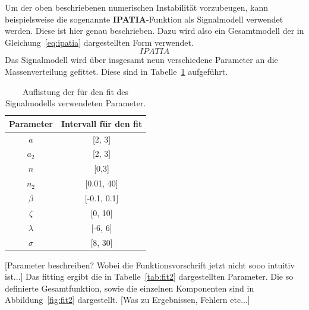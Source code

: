 %
Um der oben beschriebenen numerischen Instabilität vorzubeugen, kann beispielsweise die sogenannte \textbf{IPATIA}-Funktion als Signalmodell verwendet werden. Diese ist hier \cite{ipatia} genau beschrieben. Dazu wird also ein Gesamtmodell der in Gleichung~\ref{eq:ipatia} dargestellten Form verwendet.
%
\begin{equation}
  IPATIA
  \label{eq:ipatia}
\end{equation}
%
Das Signalmodell wird über insgesamt neun verschiedene Parameter an die Massenverteilung gefittet. Diese sind in Tabelle~\ref{tab:params} aufgeführt.
%
\begin{table}[H]
  \centering
  \caption{Auflistung der für den fit des Signalmodells verwendeten Parameter.}
  \begin{tabular}{cc}
    \toprule
    Parameter    & Intervall für den fit \\
    \midrule
    $a$          & [2, 3] \\
    $a_2$        & [2, 3] \\
    $n$          & [0,3] \\
    $n_2$        & [0.01, 40] \\
    $\beta$      & [-0.1, 0.1] \\
    $\zeta$      & [0, 10] \\
    $\lambda$    & [-6, 6] \\
    $\sigma$     & [8, 30] \\
    \bottomrule
  \end{tabular}
  \label{tab:params}
\end{table}
%
[Parameter beschreiben? Wobei die Funktionsvorschrift jetzt nicht sooo intuitiv ist...]
Das fitting ergibt die in Tabelle~\ref{tab:fit2} dargestellten Parameter. Die so definierte Gesamtfunktion, sowie die einzelnen Komponenten sind in Abbildung~\ref{fig:fit2} dargestellt. [Was zu Ergebnissen, Fehlern etc...]
%
